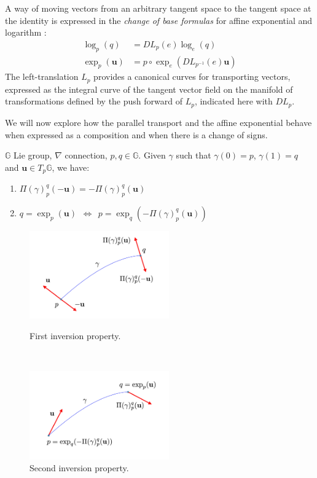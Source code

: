 A way of moving vectors from an arbitrary tangent space to the tangent space at the identity is expressed in the \emph{change of base formulas} for affine exponential and logarithm \cite{arsigny2006bi}:
\begin{align}\label{eq:DL_DR}
\log _{p}(q)  &= DL_{p}(e) \log _{e}(q)  \\
\exp _{p}(\mathbf{u})  &= p\circ \exp_{e} (DL_{p^{-1}}(e) \mathbf{u})
\end{align}
The left-translation $L_{p}$ provides a canonical curves for transporting vectors, expressed as the integral curve of the tangent vector field on the manifold of transformations defined by the push forward of $L_{p}$, indicated here with $DL_{p}$.

We will now explore how the parallel transport and the affine exponential behave when expressed as a composition and when there is a change of signs.
\begin{prop}[Inversion]
	$\mathbb{G}$ Lie group, $\nabla$ connection, $p,q\in\mathbb{G}$. Given $\gamma$ such that $\gamma(0)= p$, $\gamma(1)=q$ and $\mathbf{u}\in T_{p}\mathbb{G}$, we have:
	\begin{enumerate}
	\item $\Pi(\gamma)_{p}^{q}(-\mathbf{u}) = -\Pi(\gamma)_{p}^{q}(\mathbf{u})$
	\item $q = \exp_{p}(\mathbf{u}) \phantom{z} \Longleftrightarrow \phantom{z} p = \exp_{q}(-\Pi(\gamma)_{p}^{q}(\mathbf{u}))$
	\end{enumerate}
\end{prop}

\begin{figure}[htbp]
	\centering
	\begin{minipage}[b]{3cm}
		\hspace{-4cm}
		\centering
		\includegraphics[width=6cm]{figures/inversion_1.pdf}
		\caption{First inversion property.}
		\label{fig:inversion_propr1}
	\end{minipage}
	\ \hspace{9mm} \
	\begin{minipage}[b]{4cm}
		\centering
		\includegraphics[width=6cm]{figures/inversion_2.pdf}
		\caption{Second inversion property.}
		\label{fig:inversion_propr2}
	\end{minipage}
\end{figure}

